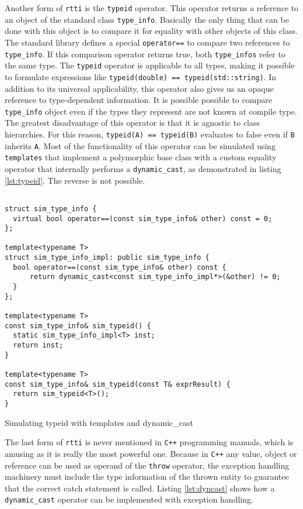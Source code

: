 Another form of \texttt{rtti} is the \texttt{typeid} operator. This operator returns a reference to an object of the standard class
\texttt{type\_info}. Basically the only thing that can be done with this object is to compare it for equality with other objects of
this class. The standard library defines a special \texttt{operator==} to compare two references to \texttt{type\_info}. If this
comparison operator returns true, both \texttt{type\_infos} refer to the same type. The \texttt{typeid} operator is applicable to all
types, making it possible to formulate expressions like \verb|typeid(double) == typeid(std::string)|. In addition to its universal
applicability, this operator also gives us an opaque reference to type-dependent information. It is possible possible to compare
\texttt{type\_info} object even if the types they represent are not known at compile type. The greatest disadvantage of this
operator is that it is agnostic to class hierarchies. For this reason, \verb|typeid(A) == typeid(B)| evaluates to false even if
\texttt{B} inherits \texttt{A}. Most of the functionality of this operator can be simulated using \texttt{templates} that implement
a polymorphic base class with a custom equality operator that internally performs a \texttt{dynamic\_cast}, as demonstrated in
listing \ref{lst:typeid}. The reverse is not possible.

\begin{listing}[H]
\begin{verbatim}
 
struct sim_type_info {
  virtual bool operator==(const sim_type_info& other) const = 0;
};

template<typename T>
struct sim_type_info_impl: public sim_type_info {
  bool operator==(const sim_type_info& other) const {
      return dynamic_cast<const sim_type_info_impl*>(&other) != 0;
  }
};

template<typename T>
const sim_type_info& sim_typeid() {
  static sim_type_info_impl<T> inst;
  return inst;
}  

template<typename T>
const sim_type_info& sim_typeid(const T& exprResult) {
  return sim_typeid<T>();
}
\end{verbatim}
\caption{Simulating typeid with templates and dynamic\_cast}
\label{lst:typeid}
\end{listing}

The last form of \texttt{rtti} is never mentioned in \texttt{C++} programming manuals, which is amusing as it is really the most powerful one.
Because in \texttt{C++} any value, object or reference can be used as operand of the \texttt{throw} operator, the exception handling
machinery must include the type information of the thrown entity to guarantee that the correct catch statement is called.
Listing \ref{lst:dyncast} shows how a \texttt{dynamic\_cast} operator can be implemented with exception handling.

